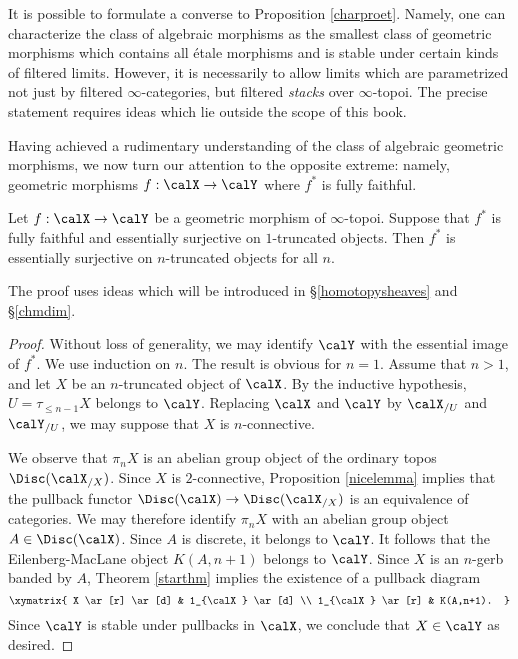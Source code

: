 \begin{remark}\label{weakcon}
It is possible to formulate a converse to Proposition \ref{charproet}. Namely, one can characterize the class of algebraic morphisms as the smallest class of geometric morphisms which contains all \'{e}tale morphisms and is stable under certain kinds of filtered limits. However, it is necessarily to allow limits which are parametrized not just by filtered $\infty$-categories, but filtered {\em stacks} over $\infty$-topoi. The precise statement requires ideas which lie outside the scope of this book.
\end{remark}

Having achieved a rudimentary understanding of the class of algebraic geometric morphisms, we now turn our attention to the opposite extreme: namely, geometric morphisms $f: \calX \rightarrow \calY$ where $f^{\ast}$ is fully faithful. 

\begin{proposition}\label{unterware}
Let $f: \calX \rightarrow \calY$ be a geometric morphism of $\infty$-topoi. Suppose that
$f^{\ast}$ is fully faithful and essentially surjective on $1$-truncated objects. Then $f^{\ast}$ is essentially surjective on $n$-truncated objects for all $n$.
\end{proposition}

The proof uses ideas which will be introduced in \S \ref{homotopysheaves} and \S \ref{chmdim}.

\begin{proof}
Without loss of generality, we may identify $\calY$ with the essential image of $f^{\ast}$.
We use induction on $n$. The result is obvious for $n = 1$. Assume that $n > 1$, and let $X$ be an $n$-truncated object of $\calX$. By the inductive hypothesis, $U= \tau_{\leq n-1} X$ belongs to $\calY$.
Replacing $\calX$ and $\calY$ by $\calX_{/ U}$ and $\calY_{ / U}$, we may suppose that $X$ is $n$-connective.

We observe that $\pi_{n} X$ is an abelian group object of the ordinary topos
$\Disc(\calX_{/X})$. Since $X$ is $2$-connective, Proposition \ref{nicelemma}
implies that the pullback functor $\Disc(\calX) \rightarrow \Disc( \calX_{/X})$ is an equivalence of categories. We may therefore identify $\pi_n X$ with an abelian group object
$A \in \Disc(\calX)$. Since $A$ is discrete, it belongs to $\calY$. It follows that
the Eilenberg-MacLane object $K(A,n+1)$ belongs to $\calY$. Since $X$ is an $n$-gerb banded by $A$, Theorem \ref{starthm} implies the existence of a pullback diagram
$$ \xymatrix{ X \ar[r] \ar[d] & 1_{\calX} \ar[d] \\
1_{\calX} \ar[r] & K(A,n+1). }$$
Since $\calY$ is stable under pullbacks in $\calX$, we conclude that $X \in \calY$ as desired.
\end{proof}

